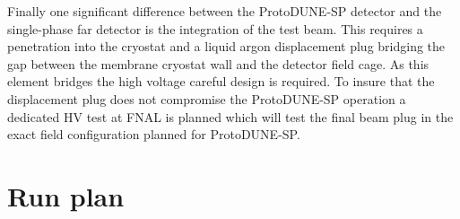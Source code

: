 Finally one significant difference between the ProtoDUNE-SP detector and the single-phase far detector is the integration of the test beam. This requires a penetration into the cryostat and a liquid argon displacement plug bridging the gap between the membrane cryostat wall and the detector field cage. As this element bridges the high voltage careful design is required. To insure that the displacement plug does not compromise the ProtoDUNE-SP operation a dedicated HV test at FNAL is planned which will test the final beam plug in the exact field configuration planned for ProtoDUNE-SP.

\section{Run plan}
\label{sec:runplan}



